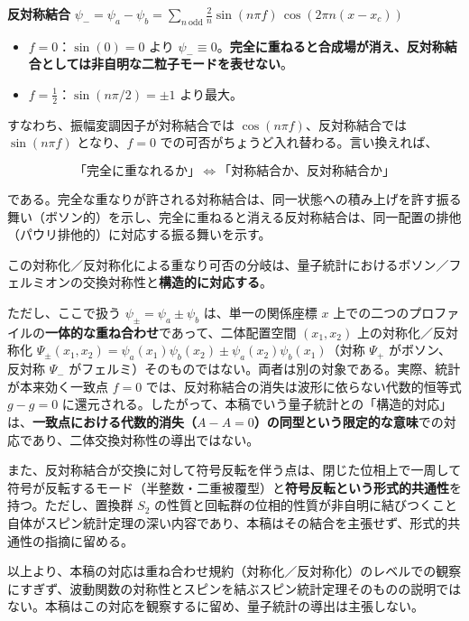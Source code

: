 \documentclass[
]{ltjsarticle}
\providecommand{\tightlist}{%
  \setlength{\itemsep}{0pt}\setlength{\parskip}{0pt}}
\begin{document}
\textbf{反対称結合}
\(\psi_{-}=\psi_a-\psi_b=\displaystyle\sum_{n\ \mathrm{odd}}\frac{2}{n}\sin(n\pi f)\,\cos(2\pi n(x-x_c))\)

\begin{itemize}
\tightlist
\item
  \(f=0\)：\(\sin(0)=0\) より
  \(\psi_{-}\equiv0\)。\textbf{完全に重ねると合成場が消え、反対称結合としては非自明な二粒子モードを表せない}。
\item
  \(f=\tfrac12\)：\(\sin(n\pi/2)=\pm1\) より最大。
\end{itemize}

すなわち、振幅変調因子が対称結合では \(\cos(n\pi f)\)、反対称結合では
\(\sin(n\pi f)\) となり、\(f=0\)
での可否がちょうど入れ替わる。言い換えれば、

\[\text{「完全に重なれるか」}\ \Longleftrightarrow\ \text{「対称結合か、反対称結合か」}\]

である。完全な重なりが許される対称結合は、同一状態への積み上げを許す振る舞い（ボソン的）を示し、完全に重ねると消える反対称結合は、同一配置の排他（パウリ排他的）に対応する振る舞いを示す。

この対称化／反対称化による重なり可否の分岐は、量子統計におけるボソン／フェルミオンの交換対称性と\textbf{構造的に対応する}。

ただし、ここで扱う \(\psi_\pm=\psi_a\pm\psi_b\) は、単一の関係座標 \(x\)
上での二つのプロファイルの\textbf{一体的な重ね合わせ}であって、二体配置空間
\((x_1,x_2)\) 上の対称化／反対称化
\(\Psi_\pm(x_1,x_2)=\psi_a(x_1)\psi_b(x_2)\pm\psi_a(x_2)\psi_b(x_1)\)（対称
\(\Psi_+\) がボソン、反対称 \(\Psi_-\)
がフェルミ）そのものではない。両者は別の対象である。実際、統計が本来効く一致点
\(f=0\) では、反対称結合の消失は波形に依らない代数的恒等式 \(g-g=0\)
に還元される。したがって、本稿でいう量子統計との「構造的対応」は、\textbf{一致点における代数的消失（\(A-A=0\)）の同型という限定的な意味}での対応であり、二体交換対称性の導出ではない。

また、反対称結合が交換に対して符号反転を伴う点は、閉じた位相上で一周して符号が反転するモード（半整数・二重被覆型）と\textbf{符号反転という形式的共通性}を持つ。ただし、置換群
\(S_2\)
の性質と回転群の位相的性質が非自明に結びつくこと自体がスピン統計定理の深い内容であり、本稿はその結合を主張せず、形式的共通性の指摘に留める。

以上より、本稿の対応は重ね合わせ規約（対称化／反対称化）のレベルでの観察にすぎず、波動関数の対称性とスピンを結ぶスピン統計定理そのものの説明ではない。本稿はこの対応を観察するに留め、量子統計の導出は主張しない。
\end{document}
